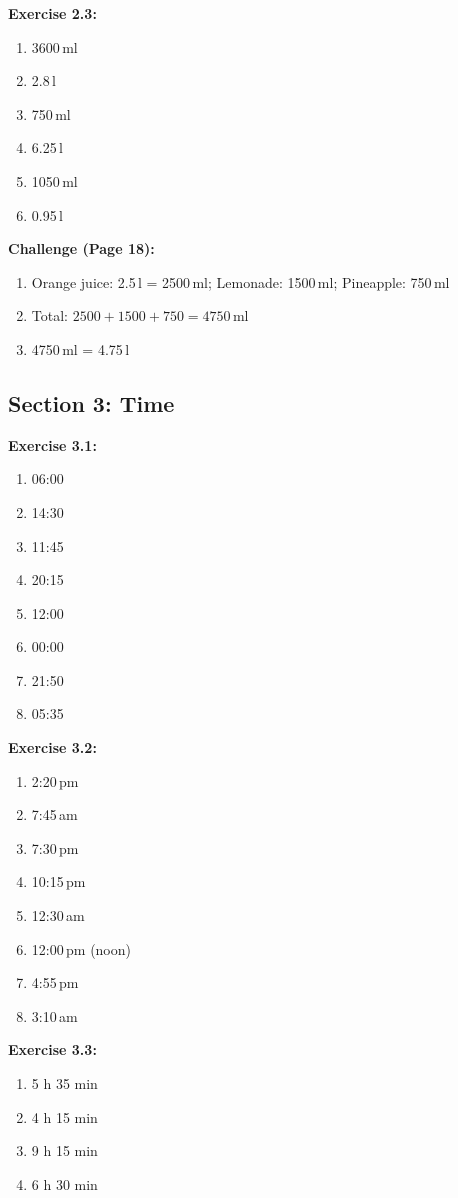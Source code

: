 \documentclass[12pt,a4paper]{article}
\begin{document}
\textbf{Exercise 2.3:}
\begin{enumerate}
\item 3600\,ml
\item 2.8\,l
\item 750\,ml
\item 6.25\,l
\item 1050\,ml
\item 0.95\,l
\end{enumerate}

\textbf{Challenge (Page 18):}
\begin{enumerate}[label=\alph*)]
\item Orange juice: 2.5\,l = 2500\,ml; Lemonade: 1500\,ml; Pineapple: 750\,ml
\item Total: $2500 + 1500 + 750 = 4750$\,ml
\item 4750\,ml = 4.75\,l
\end{enumerate}

\subsection{Section 3: Time}

\textbf{Exercise 3.1:}
\begin{enumerate}
\item 06:00
\item 14:30
\item 11:45
\item 20:15
\item 12:00
\item 00:00
\item 21:50
\item 05:35
\end{enumerate}

\textbf{Exercise 3.2:}
\begin{enumerate}
\item 2:20\,pm
\item 7:45\,am
\item 7:30\,pm
\item 10:15\,pm
\item 12:30\,am
\item 12:00\,pm (noon)
\item 4:55\,pm
\item 3:10\,am
\end{enumerate}

\textbf{Exercise 3.3:}
\begin{enumerate}
\item 5 h 35 min
\item 4 h 15 min
\item 9 h 15 min
\item 6 h 30 min
\end{enumerate}
\end{document}
